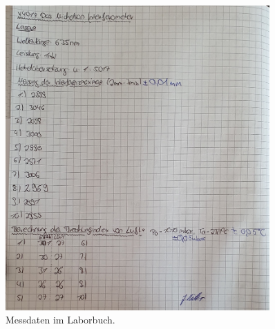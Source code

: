 \begin{figure}
    \centering
    \includegraphics[width=0.9\textwidth]{Laborbuch.jpg}
    \caption{Messdaten im Laborbuch.}
\end{figure}



